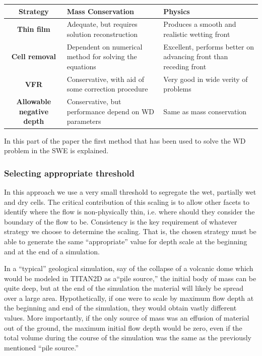 \documentclass[letterpaper,10pt]{article}
\begin{document}
\begin{center}\label{table1}
	\begin{tabular}{|c|p{5cm}|p{5cm}|}
		\hline
		{\bf Strategy}                  & {\bf Mass Conservation}                                          & {\bf Physics} \\
		\hline
		{\bf Thin film}                 & Adequate, but requires solution reconstruction 
		& Produces a smooth and realistic wetting front     \\
		\hline 
		{\bf Cell removal}              & Dependent on numerical method for solving the equations          & Excellent, performs better on advancing front than receding front \\
		\hline
		{\bf VFR}                       & Conservative, with aid of some correction procedure              & Very good in wide verity of problems      \\
		\hline
		{\bf Allowable negative depth}  & Conservative, but performance depend on WD parameters            & Same as mass conservation      \\
		\hline
	\end{tabular}
\end{center}
In this part of the paper the first method that has been used to solve the WD problem in the SWE is explained.

\subsubsection{Selecting appropriate threshold} \label{Threshold}
In this approach we use a very small threshold to segregate the wet, partially wet and dry cells.
The critical contribution of this scaling is to allow other
facets to identify where the flow %
is non-physically thin, i.e. where should they consider the boundary of
the flow to be. Consistency is the key requirement of whatever strategy we choose to
determine the scaling. That is, the
chosen strategy must be able to generate the same ``appropriate'' value
for depth scale at the beginning and at the end of a simulation.  \newline

In a ``typical'' geological simulation, say of the collapse of a volcanic 
dome which would be modeled in TITAN2D as a``pile source,'' the initial 
body of mass can be quite deep, but at the end of the simulation the 
material will likely be spread over a large area.  Hypothetically, if one 
were to scale by maximum flow depth at the beginning and end of the 
simulation, they would obtain vastly different values.  More importantly, 
if the only source of mass was an effusion of material out of the ground, 
the maximum initial flow depth would be zero, even if the total volume 
during the course of the simulation was the same as the previously 
mentioned ``pile source.''  \newline
\end{document}
